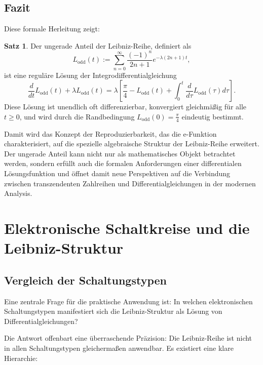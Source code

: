 \documentclass[a4paper, 12pt, twoside, openright]{report}
\theoremstyle{definition}
\theoremstyle{definition}
\newtheorem{satz}{Satz}[chapter]
\begin{document}
\subsection{Fazit}

Diese formale Herleitung zeigt:

\begin{satz}
	Der ungerade Anteil der Leibniz-Reihe, definiert als
	$$L_{\text{odd}}(t) := \sum_{n=0}^{\infty} \frac{(-1)^n}{2n+1} e^{-\lambda(2n+1)t},$$
	ist eine reguläre Lösung der Integrodifferentialgleichung
	$$\frac{d}{dt} L_{\text{odd}}(t) + \lambda L_{\text{odd}}(t) = \lambda \left[ \frac{\pi}{4} - L_{\text{odd}}(t) + \int_0^t \frac{d}{d\tau} L_{\text{odd}}(\tau) d\tau \right].$$
	Diese Lösung ist unendlich oft differenzierbar, konvergiert gleichmäßig für alle $t \geq 0$, und wird durch die Randbedingung $L_{\text{odd}}(0) = \frac{\pi}{4}$ eindeutig bestimmt.
\end{satz}

Damit wird das Konzept der Reproduzierbarkeit, das die e-Funktion charakterisiert, auf die spezielle algebraische Struktur der Leibniz-Reihe erweitert. Der ungerade Anteil kann nicht nur als mathematisches Objekt betrachtet werden, sondern erfüllt auch die formalen Anforderungen einer differentialen Lösungsfunktion und öffnet damit neue Perspektiven auf die Verbindung zwischen transzendenten Zahlreihen und Differentialgleichungen in der modernen Analysis.

\section{Elektronische Schaltkreise und die Leibniz-Struktur}

\subsection{Vergleich der Schaltungstypen}

Eine zentrale Frage für die praktische Anwendung ist: In welchen elektronischen Schaltungstypen manifestiert sich die Leibniz-Struktur als Lösung von Differentialgleichungen? 

Die Antwort offenbart eine überraschende Präzision: Die Leibniz-Reihe ist nicht in allen Schaltungstypen gleichermaßen anwendbar. Es existiert eine klare Hierarchie:
\end{document}
